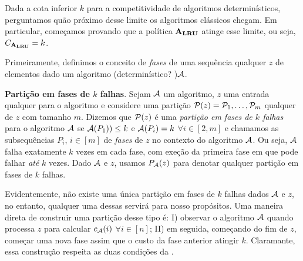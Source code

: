 Dada a cota inferior \(k\) para a competitividade de algoritmos determinísticos, perguntamos quão próximo desse limite os algoritmos clássicos chegam. Em particular, começamos provando que a política \(\mathbf{A_{LRU}}\) atinge esse limite, ou seja, \(C_{\mathbf{A_{LRU}}} = k\).

Primeiramente, definimos o conceito de \emph{fases} de uma sequência qualquer \(z\) de elementos dado um algoritmo (determinístico? )\(\mathcal{A}\).

\begin{definition}
  \label{def:fases}
  \textbf{Partição em fases de \(k\) falhas}. Sejam \(\mathcal{A}\) um algoritmo, \(z\) uma entrada qualquer para o algoritmo e considere uma partição \(\mathcal{P}(z) = \mathcal{P}_1, \dotsc, \mathcal{P}_m\) qualquer de \(z\) com tamanho \(m\). Dizemos que \(\mathcal{P}(z)\) é uma \emph{partição em fases de \(k\) falhas} para o algoritmo \(\mathcal{A}\) se \(\mathcal{A}(P_1)) \le k\) e \(\mathcal{A}(P_i) = k\) \(\forall i \in [2,m]\) e chamamos as subsequências \(P_i\), \(i \in [m]\) de \emph{fases} de \(z\) no contexto do algoritmo \(\mathcal{A}\). Ou seja, \(\mathcal{A}\) falha exatamente \(k\) vezes em cada fase, com exeção da primeira fase em que pode falhar \emph{até} \(k\) vezes. Dado \(\mathcal{A}\) e \(z\), usamos \(P_{\mathcal{A}}(z)\) para denotar qualquer partição em fases de \(k\) falhas.
\end{definition}

Evidentemente, não existe uma única partição em fases de \(k\) falhas dados \(\mathcal{A}\) e \(z\), no entanto, qualquer uma dessas servirá para nosso propósitos. Uma maneira direta de construir uma partição desse tipo é: I) observar o algoritmo \(\mathcal{A}\) quando processa \(z\) para calcular \(c_{\mathcal{A}}(i)\) \(\forall i \in [n]\); II) em seguida, começando do fim de \(z\), começar uma nova fase assim que o custo da fase anterior atingir \(k\). Claramante, essa construção respeita as duas condições da .

